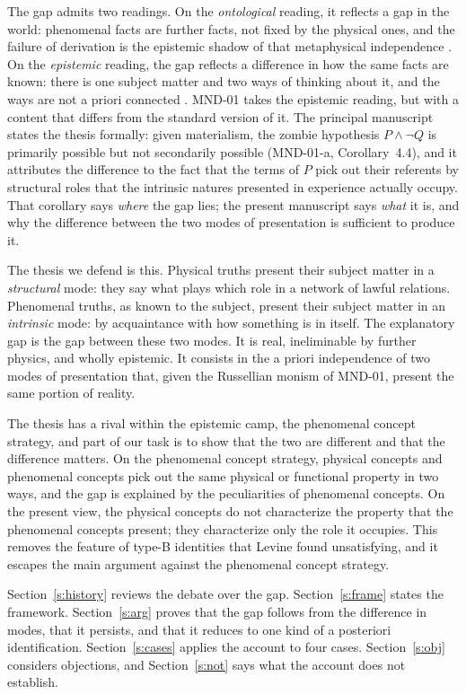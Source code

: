 \documentclass{situationist-preprint}
\begin{document}
The gap admits two readings. On the \emph{ontological} reading, it reflects a gap in the world: phenomenal facts are further facts, not fixed by the physical ones, and the failure of derivation is the epistemic shadow of that metaphysical independence \citep{Chalmers1996}. On the \emph{epistemic} reading, the gap reflects a difference in how the same facts are known: there is one subject matter and two ways of thinking about it, and the ways are not a priori connected \citep{Loar1990,Papineau2002}. MND-01 takes the epistemic reading, but with a content that differs from the standard version of it. The principal manuscript states the thesis formally: given materialism, the zombie hypothesis $P \wedge \neg Q$ is primarily possible but not secondarily possible (MND-01-a, Corollary~4.4), and it attributes the difference to the fact that the terms of $P$ pick out their referents by structural roles that the intrinsic natures presented in experience actually occupy. That corollary says \emph{where} the gap lies; the present manuscript says \emph{what} it is, and why the difference between the two modes of presentation is sufficient to produce it.

The thesis we defend is this. Physical truths present their subject matter in a \emph{structural} mode: they say what plays which role in a network of lawful relations. Phenomenal truths, as known to the subject, present their subject matter in an \emph{intrinsic} mode: by acquaintance with how something is in itself. The explanatory gap is the gap between these two modes. It is real, ineliminable by further physics, and wholly epistemic. It consists in the a priori independence of two modes of presentation that, given the Russellian monism of MND-01, present the same portion of reality.

The thesis has a rival within the epistemic camp, the phenomenal concept strategy, and part of our task is to show that the two are different and that the difference matters. On the phenomenal concept strategy, physical concepts and phenomenal concepts pick out the same physical or functional property in two ways, and the gap is explained by the peculiarities of phenomenal concepts. On the present view, the physical concepts do not characterize the property that the phenomenal concepts present; they characterize only the role it occupies. This removes the feature of type-B identities that Levine found unsatisfying, and it escapes the main argument against the phenomenal concept strategy.

Section~\ref{s:history} reviews the debate over the gap. Section~\ref{s:frame} states the framework. Section~\ref{s:arg} proves that the gap follows from the difference in modes, that it persists, and that it reduces to one kind of a posteriori identification. Section~\ref{s:cases} applies the account to four cases. Section~\ref{s:obj} considers objections, and Section~\ref{s:not} says what the account does not establish.
\end{document}

